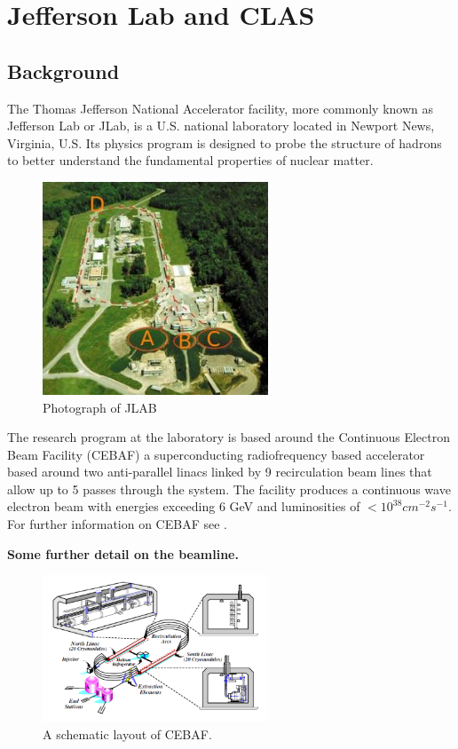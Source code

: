 \chapter{Jefferson Lab and CLAS}

\section{Background}
The Thomas Jefferson National Accelerator facility, more commonly known as Jefferson Lab or JLab, is a U.S. national laboratory located in Newport News, Virginia, U.S. Its physics program is designed to probe the structure of hadrons to better understand the fundamental properties of nuclear matter. 

\begin{figure}
	\centering
	\includegraphics[width=0.6\textwidth]{ImgChap1/jlab1}
	\caption{Photograph of JLAB}
	\label{JLABAirial}
\end{figure}

The research program at the laboratory is based around the Continuous Electron Beam Facility (CEBAF) a superconducting radiofrequency based accelerator based around two anti-parallel linacs linked by 9 recirculation beam lines that allow up to 5 passes through the system. The facility produces a continuous wave electron beam with energies exceeding 6 GeV and luminosities of $< 10^{38} cm^{-2}s^{-1}$. For further information on CEBAF see \cite{leemann2001continuous}.

\textbf{Some further detail on the beamline.}

\begin{figure}
\centering
\includegraphics[width=0.6\textwidth]{ImgChap1/CEBAF1}
\caption{A schematic layout of CEBAF.}
\label{CEBAF}
\end{figure}

